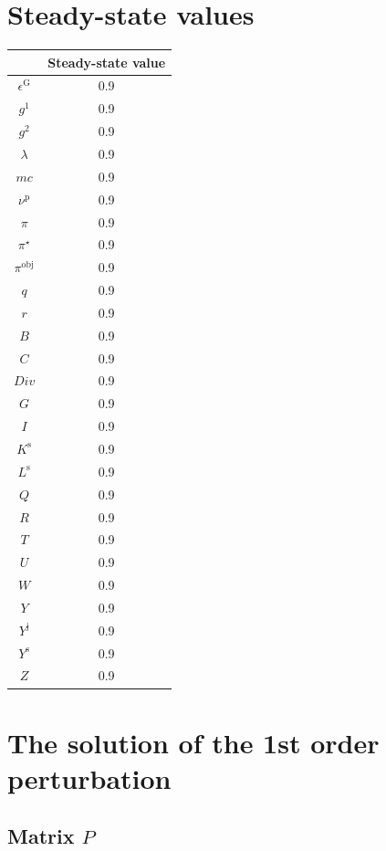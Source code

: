 

\section{Steady-state values}


\begin{tabular}{c|c|}
  & Steady-state value\\
\hline
$\epsilon^{\mathrm{G}}$ & 0.9 \\
$g^{\mathrm{1}}$ & 0.9 \\
$g^{\mathrm{2}}$ & 0.9 \\
$\lambda$ & 0.9 \\
${m\!c}$ & 0.9 \\
$\nu^{\mathrm{p}}$ & 0.9 \\
$\pi$ & 0.9 \\
$\pi^{\star}$ & 0.9 \\
$\pi^{\mathrm{obj}}$ & 0.9 \\
$q$ & 0.9 \\
$r$ & 0.9 \\
$B$ & 0.9 \\
$C$ & 0.9 \\
${D\!i\!v}$ & 0.9 \\
$G$ & 0.9 \\
$I$ & 0.9 \\
$K^{\mathrm{s}}$ & 0.9 \\
$L^{\mathrm{s}}$ & 0.9 \\
$Q$ & 0.9 \\
$R$ & 0.9 \\
$T$ & 0.9 \\
$U$ & 0.9 \\
$W$ & 0.9 \\
$Y$ & 0.9 \\
$Y^{\mathrm{j}}$ & 0.9 \\
$Y^{\mathrm{s}}$ & 0.9 \\
$Z$ & 0.9 \\
\hline
\end{tabular}


\section{The solution of the 1st order perturbation}

\subsection*{Matrix $P$}

